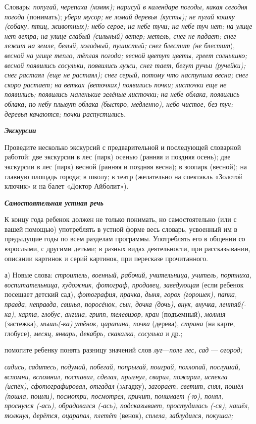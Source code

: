 \documentclass[a5paper]{book}
\renewcommand{\emph}[1]{\textit{#1}}
\begin{document}
Словарь: \emph{попугай, черепаха (хомяк); нарисуй в календаре погоды,
какая сегодня погода} (понимать); \emph{убери мусор; не ломай деревья
(кусты); не пугай кошку (собаку, птиц, животных); небо серое; на небе
тучи; на небе туч нет; на улице нет ветра; на улице слабый (сильный)
ветер; метель, снег не падает; снег лежит на земле, белый, холодный,
пушистый; снег блестит (не блестит}), \emph{весной на улице тепло,
тёплая погода; весной цветут цветы, греет солнышко; весной появились
сосульки, появились лужи, снег тает, бегут ручьи (ручейки); снег растаял
(еще не растаял); снег серый, потому что наступила весна; снег скоро
растает; на ветках (веточках) появились почки; листочки еще не
появились; появились маленькие зелёные листочки; на небе облака,
появились облака; по небу плывут облака (быстро, медленно), небо чистое,
без туч; деревья качаются; почки распустились.}

\emph{\textbf{Экскурсии}}

Проведите несколько экскурсий с предварительной и последующей словарной
работой: две экскурсии в лес (парк) осенью (ранняя и поздняя осень); две
экскурсии в лес (парк) весной (ранняя и поздняя весна); в зоопарк
(весной); на главную площадь города; в школу; в театр (желательно на
спектакль «Золотой ключик» и на балет «Доктор Айболит»).

\emph{\textbf{Самостоятельная устная речь}}

К концу года ребенок должен не только понимать, но самостоятельно (или с
вашей помощью) употреблять в устной форме весь словарь, усвоенный им в
предыдущие годы по всем разделам программы. Употреблять его в общении со
взрослыми, с другими детьми; в разных видах деятельности, при
рассказывании, описании картинок и серий картинок, при пересказе
прочитанного.

а) Новые слова: \emph{строитель, военный, рабочий, учительница, учитель,
портниха, воспитательница, художник, фотограф, продавец, заведующая}
(если ребенок посещает детский сад), \emph{фотография, прачка, дыня,
горох (горошек), папка, правда, неправда, свинья, поросёнок, сын, дочка
(дочь), внук, внучка, лентяй(-ка), карта, глобус, ангина, грипп,
телевизор, кран} (подъемный), \emph{молния} (застежка), \emph{мышь(-ка)
утёнок, царапина, почка} (дерева), \emph{страна} (на карте, глобусе),
\emph{месяц, январь, декабрь, скакалка, сосулька} и др.;

помогите ребенку понять разницу значений слов \emph{луг}---\emph{поле
лес, сад} --- \emph{огород;}

\emph{садись, садитесь, подумай, побегай, попрыгай, поиграй, похлопай,
послушай, вспомни, вспомнил, поставил, сделал, прыгнул,} \emph{сварил,
пожарил, испекла (испёк), сфотографировал, отгадал} (\textsc{за}гадку),
\emph{загорает, светит, снял, пошёл (пошла, пошли), посмотри, посмотрел,
кричит, понимает (-ю), понял, проснулся (-ась), обрадовался (-ась),
подсказывает, простудилась (-ся), нашёл, толкнул, дерётся, оцарапал,
плетёт} (венок), \emph{сплела, заблудился, покушал;}
\end{document}
